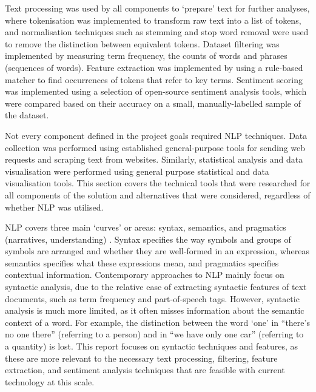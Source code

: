 \documentclass{report}
\begin{document}
Text processing was used by all components to `prepare' text for further analyses, where tokenisation was implemented to transform raw text into a list of tokens, and normalisation techniques such as stemming and stop word removal \cite{Nltk} were used to remove the distinction between equivalent tokens.
Dataset filtering was implemented by measuring term frequency, the counts of words and phrases (sequences of words).
Feature extraction was implemented by using a rule-based matcher to find occurrences of tokens that refer to key terms.
Sentiment scoring was implemented using a selection of open-source sentiment analysis tools, which were compared based on their accuracy on a small, manually-labelled sample of the dataset.

Not every component defined in the project goals required NLP techniques.
Data collection was performed using established general-purpose tools for sending web requests and scraping text from websites.
Similarly, statistical analysis and data visualisation were performed using general purpose statistical and data visualisation tools.
This section covers the technical tools that were researched for all components of the solution and alternatives that were considered, regardless of whether NLP was utilised.

NLP covers three main `curves' or areas: syntax, semantics, and pragmatics (narratives, understanding) \cite{cambria2014jumping}. 
Syntax specifies the way symbols and groups of symbols are arranged and whether they are well-formed in an expression, whereas semantics specifies what these expressions mean, and pragmatics specifies contextual information.
Contemporary approaches to NLP mainly focus on syntactic analysis, due to the relative ease of extracting syntactic features of text documents, such as term frequency and part-of-speech tags.
However, syntactic analysis is much more limited, as it often misses information about the semantic context of a word.
For example, the distinction between the word `one' in ``there's no one there'' (referring to a person) and in ``we have only one car'' (referring to a quantity) is lost.
This report focuses on syntactic techniques and features, as these are more relevant to the necessary text processing, filtering, feature extraction, and sentiment analysis techniques that are feasible with current technology at this scale.
\end{document}

